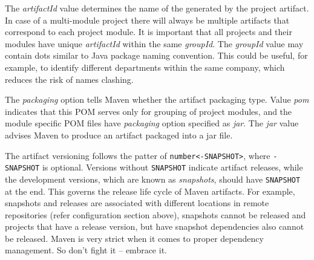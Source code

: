   The \emph{artifactId} value determines the name of the generated by the project artifact.
  In case of a multi-module project there will always be multiple artifacts that correspond to each project module.
  It is important that all projects and their modules have unique \emph{artifactId} within the same \emph{groupId}.
  The \emph{groupId} value may contain dots similar to Java package naming convention.  
  This could be useful, for example, to identify different departments within the same company, which reduces the risk of names clashing.
  
  The \emph{packaging} option tells Maven whether the artifact packaging type.
  Value \emph{pom} indicates that this POM serves only for grouping of project modules, and the module specific POM files have \emph{packaging} option specified as \emph{jar}.
  The \emph{jar} value advises Maven to produce an artifact packaged into a jar file.

  The artifact versioning follows the patter of \texttt{number<-SNAPSHOT>}, where \texttt{-SNAPSHOT} is optional.
  Versions without \texttt{SNAPSHOT} indicate artifact releases, while the development versions, which are known as \emph{snapshots}, should have \texttt{SNAPSHOT} at the end.
  This governs the release life cycle of Maven artifacts.
  For example, snapshots and releases are associated with different locations in remote repositories (refer configuration section above), snapshots cannot be released and projects that have a release version, but have snapshot dependencies also cannot be released.
  Maven is very strict when it comes to proper dependency management.
  So don't fight it -- embrace it.
  

